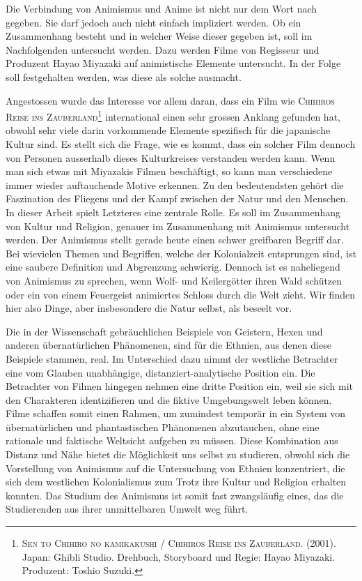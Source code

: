 
Die Verbindung von Animismus und Anime ist nicht nur dem Wort nach gegeben. Sie darf jedoch auch nicht einfach impliziert werden. Ob ein Zusammenhang besteht und in welcher Weise dieser gegeben ist, soll im Nachfolgenden untersucht werden. Dazu werden Filme von Regisseur und Produzent Hayao Miyazaki auf animistische Elemente untersucht. In der Folge soll festgehalten werden, was diese als solche ausmacht.

Angestossen wurde das Interesse vor allem daran, dass ein Film wie \textsc{\mbox{Chihiros} Reise ins Zauberland}\footnote{\textsc{Sen to Chihiro no kamikakushi / Chihiros Reise ins Zauberland}. (2001). Japan: Ghibli Studio. Drehbuch, Storyboard und Regie: Hayao Miyazaki. Produzent: Toshio Suzuki.} international einen sehr grossen Anklang gefunden hat, obwohl sehr viele darin vorkommende Elemente spezifisch für die japanische Kultur sind. Es stellt sich die Frage, wie es kommt, dass ein solcher Film dennoch von Personen ausserhalb dieses Kulturkreises verstanden werden kann. Wenn man sich etwas mit Miyazakis Filmen beschäftigt, so kann man verschiedene immer wieder auftauchende Motive erkennen. Zu den bedeutendsten gehört die Faszination des Fliegens und der Kampf zwischen der Natur und den Menschen. In dieser Arbeit spielt Letzteres eine zentrale Rolle. Es soll im Zusammenhang von Kultur und Religion, genauer im Zusammenhang mit Animismus untersucht werden. Der Animismus stellt gerade heute einen schwer greifbaren Begriff dar. Bei wievielen Themen und Begriffen, welche der Kolonialzeit entsprungen sind, ist eine saubere Definition und Abgrenzung schwierig. Dennoch ist es naheliegend von Animismus zu sprechen, wenn Wolf- und Keilergötter ihren Wald schützen oder ein von einem Feuergeist animiertes Schloss durch die Welt zieht. Wir finden hier also Dinge, aber insbesondere die Natur selbst, als beseelt vor. 

Die in der Wissenschaft gebräuchlichen Beispiele von Geistern, Hexen und anderen übernatürlichen Phänomenen, sind für die Ethnien, aus denen diese Beispiele stammen, real. Im Unterschied dazu nimmt der westliche Betrachter eine vom Glauben unabhängige, distanziert-analytische Position ein. Die Be\-trachter von Filmen hingegen nehmen eine dritte Position ein, weil sie sich mit den Charakteren identizifieren und die fiktive Umgebungswelt leben können. Filme schaffen somit einen Rahmen, um zumindest temporär in ein System von übernatürlichen und phantastischen Phänomenen abzutauchen, ohne eine rationale und faktische Weltsicht aufgeben zu müssen. Diese Kombination aus Distanz und Nähe bietet die Möglichkeit uns selbst zu studieren, obwohl sich die Vorstellung von Animismus auf die Untersuchung von Ethnien konzentriert, die sich dem westlichen Kolonialismus zum Trotz ihre Kultur und Religion erhalten konnten. Das Studium des Animismus ist somit fast zwangsläufig eines, das die Studierenden aus ihrer unmittelbaren Umwelt weg führt. 

